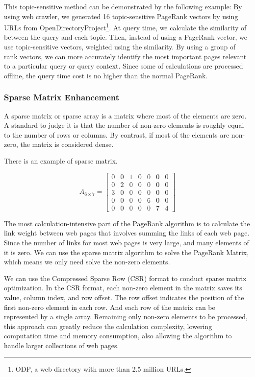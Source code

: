 \documentclass[lettersize,journal,12pt,conference]{IEEEtran}
\begin{document}
This topic-sensitive method can be demonstrated by the following example\cite{ref7}:
By using web crawler, we generated 16 topic-sensitive PageRank vectors by using URLs from OpenDirectoryProject\footnote[1]{ODP, a web directory with more than 2.5 million URLs.}.
At query time, we calculate the similarity of between the query and each topic.
Then, instead of using a PageRank vector, we use topic-sensitive vectors, weighted using the similarity.
By using a group of rank vectors, we can more accurately identify the most important pages relevant to a particular query or query context.
Since some of calculations are processed offline, the query time cost is no higher than the normal PageRank.

\subsubsection{Sparse Matrix Enhancement}

A sparse matrix or sparse array is a matrix where most of the elements are zero.
A standard to judge it is that the number of non-zero elements is roughly equal to the number of rows or columns. By contrast, if most of the elements are non-zero, the matrix is considered dense.

There is an example of sparse matrix.

\begin{equation}
	A_{6\times 7}=
	\begin{bmatrix}
		0 & 0 & 1 & 0 & 0 & 0 & 0 \\
		0 & 2 & 0 & 0 & 0 & 0 & 0 \\
		3 & 0 & 0 & 0 & 0 & 0 & 0 \\
		0 & 0 & 0 & 0 & 6 & 0 & 0 \\
		0 & 0 & 0 & 0 & 0 & 7 & 4
	\end{bmatrix}
\end{equation}

The most calculation-intensive part of the PageRank algorithm is to calculate the link weight between web pages that involves summing the links of each web page.
Since the number of links for most web pages is very large, and many elements of it is zero. We can use the sparse matrix algorithm to solve the PageRank Matrix, which means we only need solve the non-zero elements.

We can use the Compressed Sparse Row (CSR) format to conduct sparse matrix optimization.
In the CSR format, each non-zero element in the matrix saves its value, column index, and row offset.
The row offset indicates the position of the first non-zero element in each row.
And each row of the matrix can be represented by a single array.
Remaining only non-zero elements to be processed, this approach can greatly reduce the calculation complexity, lowering computation time and memory consumption, also allowing the algorithm to handle larger collections of web pages.
\end{document}
